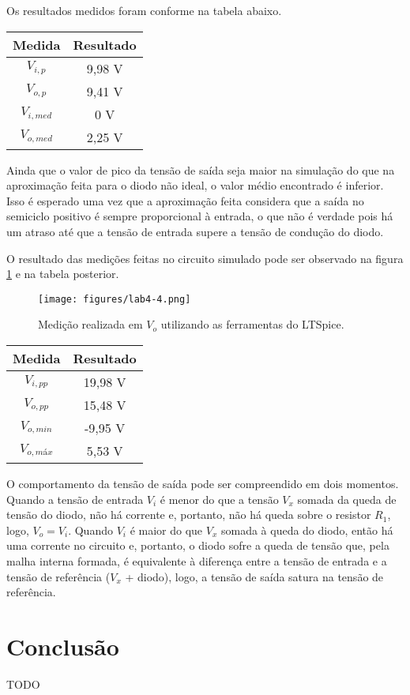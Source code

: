 \documentclass[a4paper]{report}
\begin{document}
Os resultados medidos foram conforme na tabela abaixo.

\begin{table}[H]
    \centering
    \begin{tabular}{c | c}
	Medida & Resultado \\
	\hline
	$V_{i,p}$ & 9,98 V \\
	$V_{o,p}$ & 9,41 V \\
	$V_{i,med}$ & 0 V \\
	$V_{o,med}$ & 2,25 V
    \end{tabular}
\end{table}

Ainda que o valor de pico da tensão de saída seja maior na simulação do que na aproximação feita para o diodo não ideal, o valor médio encontrado é inferior. Isso é esperado uma vez que a aproximação feita considera que a saída no semiciclo positivo é sempre proporcional à entrada, o que não é verdade pois há um atraso até que a tensão de entrada supere a tensão de condução do diodo.


O resultado das medições feitas no circuito simulado pode ser observado na figura \ref{fig:figures-lab4-4-png} e na tabela posterior.

\begin{figure}[H]
    \centering
    \texttt{[image: figures/lab4-4.png]}
    \caption{Medição realizada em $V_o$ utilizando as ferramentas do LTSpice.}
    \label{fig:figures-lab4-4-png}
\end{figure}

\begin{table}[H]
    \centering
    \begin{tabular}{c | c}
	Medida & Resultado \\
	\hline
	$V_{i,pp}$ & 19,98 V \\
	$V_{o,pp}$ & 15,48 V \\
	$V_{o,min}$ & -9,95 V \\
	$V_{o,máx}$ & 5,53 V \\
    \end{tabular}
\end{table}

O comportamento da tensão de saída pode ser compreendido em dois momentos. Quando a tensão de entrada $V_i$ é menor do que a tensão $V_x$ somada da queda de tensão do diodo, não há corrente e, portanto, não há queda sobre o resistor $R_1$, logo, $V_o = V_i$. Quando $V_i$ é maior do que $V_x$ somada à queda do diodo, então há uma corrente no circuito e, portanto, o diodo sofre a queda de tensão que, pela malha interna formada, é equivalente à diferença entre a tensão de entrada e a tensão de referência ($V_x$ + diodo), logo, a tensão de saída satura na tensão de referência.

\section*{Conclusão}

TODO
\end{document}
